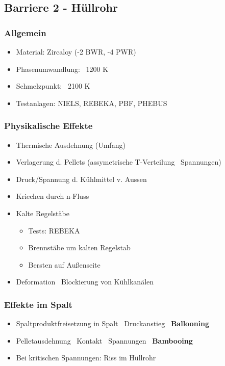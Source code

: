 \documentclass[12pt]{article}
\begin{document}
\subsection{Barriere 2 - Hüllrohr}

\subsubsection{Allgemein}
\begin{itemize}
  \item Material: Zircaloy (-2 BWR, -4 PWR)
  \item Phasenumwandlung: ~1200 K
  \item Schmelzpunkt: ~2100 K
  \item Testanlagen: NIELS, REBEKA, PBF, PHEBUS
\end{itemize}

\subsubsection{Physikalische Effekte}
\begin{itemize}
  \item Thermische Ausdehnung (Umfang)
  \item Verlagerung d. Pellets (assymetrische T-Verteilung \textrightarrow\ Spannungen)
  \item Druck/Spannung d. Kühlmittel v. Aussen
  \item Kriechen durch n-Fluss
  \item Kalte Regelstäbe
  \begin{itemize}
    \item Tests: REBEKA
    \item Brennstäbe um kalten Regelstab
    \item Bersten auf Außenseite
  \end{itemize}
  \item Deformation \textrightarrow\ Blockierung von Kühlkanälen
\end{itemize}

\subsubsection{Effekte im Spalt}
\begin{itemize}
  \item Spaltproduktfreisetzung in Spalt \textrightarrow\ Druckanstieg \textrightarrow\ \textbf{Ballooning}
  \item Pelletausdehnung \textrightarrow\ Kontakt \textrightarrow\ Spannungen \textrightarrow\ \textbf{Bambooing}
  \item Bei kritischen Spannungen: Riss im Hüllrohr
\end{itemize}
\end{document}
